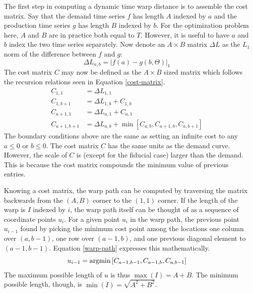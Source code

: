 The first step in computing a dynamic time warp distance is to 
assemble the cost matrix. Say that the demand time series $f$ has 
length $A$ indexed by $a$ and the production time series $g$ has 
length $B$ indexed by $b$. For the optimization problem here, $A$ and $B$
are in practice both equal to $T$.  However, it is useful to have $a$ and 
$b$ index the two time series separately. Now denote an $A\times B$ matrix 
$\Delta L$ as the $L_1$ norm of the difference between $f$ and $g$:
\begin{equation}
\label{delta-l1}
\Delta L_{a,b} = \left|f(a) - g(b, \Theta)\right|_1
\end{equation}
The cost matrix $C$ may now be defined as the $A\times B$ sized matrix 
which follows the recursion relations seen in Equation \ref{cost-matrix}.
\begin{equation}
\label{cost-matrix}
\begin{split}
C_{1,1} & = \Delta L_{1,1}\\
C_{1,b+1} & = \Delta L_{1,b} + C_{1,b}\\
C_{a+1,1} & = \Delta L_{a,1} + C_{a,1}\\
C_{a+1,b+1} & = \Delta L_{a,b} + \min\left[C_{a,b}, C_{a+1,b}, C_{a,b+1}\right]
\end{split}
\end{equation}
The boundary conditions above are the same as setting an infinite cost to 
any $a \le 0$ or $b \le 0$. The cost matrix $C$ has the same units as the 
demand curve. However, the scale of $C$ is (except for the fiducial case) 
larger than the demand. This is because the cost matrix compounds the 
minimum value of previous entries. 

Knowing a cost matrix, the warp path can be computed by traversing the 
matrix backwards from the $(A, B)$ corner to the $(1, 1)$ corner.
If the length of the warp is $I$ indexed by $i$, the warp path itself 
can be thought of as a sequence of coordinate points $u_i$. For a given 
point $u_i$ in the warp path, the previous point $u_{i-1}$ found by 
picking the minimum cost point among the locations one column over $(a,b-1)$, 
one row over $(a-1,b)$, and one previous diagonal element to $(a-1,b-1)$. 
Equation \ref{warp-path} expresses this mathematically.
\begin{equation}
\label{warp-path}
u_{i-1} = \mathrm{argmin}\left[C_{a-1,b-1}, C_{a-1,b}, C_{a,b-1}\right]
\end{equation}
The maximum possible length of $u$ is thus $\max(I) = A + B$.
The minimum possible length, though, is $\min(I) = \sqrt{A^2 + B^2}$. 

